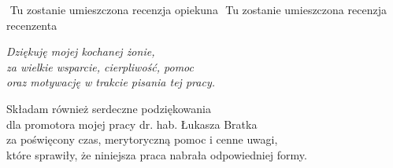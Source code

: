 {\newpage
$ $
\newpage
Tu zostanie umieszczona recenzja opiekuna
\newpage
$ $
\newpage
Tu zostanie umieszczona recenzja recenzenta
\newpage
$ $
\newpage
\vspace*{\fill}
{\flushright \it
Dziękuję mojej kochanej żonie, \\
za wielkie wsparcie, cierpliwość, pomoc\\ 
oraz motywację w trakcie pisania tej pracy. \\
\vspace{0.7cm}

Składam również serdeczne podziękowania\\
dla promotora mojej pracy 
dr. hab. Łukasza Bratka\\
za poświęcony czas, merytoryczną pomoc i cenne uwagi,\\
które sprawiły, że niniejsza praca nabrała odpowiedniej formy.\\
}
\vspace{3cm}
\newpage
}
\linespread{1.3}
\selectfont
